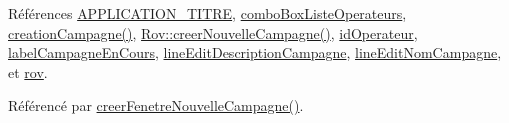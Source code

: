 Références \hyperlink{ihmrov_8h_ab599af93fd63f0c5df05b03aa7448eb9}{A\+P\+P\+L\+I\+C\+A\+T\+I\+O\+N\+\_\+\+T\+I\+T\+RE}, \hyperlink{class_i_h_m_rov_a32ee4423982fa3a78e59167ed2354f6e}{combo\+Box\+Liste\+Operateurs}, \hyperlink{class_i_h_m_rov_a4a4a90ab6d074aa54466f3f87db2f81c}{creation\+Campagne()}, \hyperlink{class_rov_ae1306036b067e9ad50a09f9dd607a092}{Rov\+::creer\+Nouvelle\+Campagne()}, \hyperlink{class_i_h_m_rov_a110af5c174e9fbba12bffbe0301ed690}{id\+Operateur}, \hyperlink{class_i_h_m_rov_a14aa781bc1a446ba6b3ecdea029caa91}{label\+Campagne\+En\+Cours}, \hyperlink{class_i_h_m_rov_aedf9fd0d893326f970aa1b73dbe06e85}{line\+Edit\+Description\+Campagne}, \hyperlink{class_i_h_m_rov_a3b3dac7166ab414832dea0b5ad1a570d}{line\+Edit\+Nom\+Campagne}, et \hyperlink{class_i_h_m_rov_a777ca33fdb295ba6b6773e880356fa1e}{rov}.



Référencé par \hyperlink{class_i_h_m_rov_a08bf623a890df272f738c1ff8631213f}{creer\+Fenetre\+Nouvelle\+Campagne()}.



